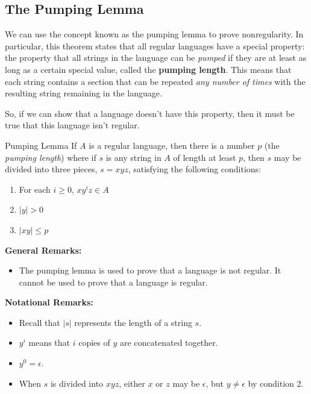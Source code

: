 \documentclass[letterpaper]{article}
\begin{document}
\subsection{The Pumping Lemma}
We can use the concept known as the pumping lemma to prove nonregularity. In particular, this theorem states that all regular languages have a special property: the property that all strings in the language can be \emph{pumped} if they are at least as long as a certain special value, called the \textbf{pumping length}. This means that each string contains a section that can be repeated \emph{any number of times} with the resulting string remaining in the language. 

\bigskip 

So, if we can show that a language doesn't have this property, then it must be true that this language isn't regular. 

\begin{theorem}{Pumping Lemma}{}
    If $A$ is a regular language, then there is a number $p$ (the \emph{pumping length}) where if $s$ is any string in $A$ of length at least $p$, then $s$ may be divided into three pieces, $s = xyz$, satisfying the following conditions: 
    \begin{enumerate}
        \item For each $i \geq 0$, $xy^i z \in A$
        \item $|y| > 0$
        \item $|xy| \leq p$
    \end{enumerate}
\end{theorem}
\textbf{General Remarks:}
\begin{itemize}
    \item The pumping lemma is used to prove that a language is not regular. It cannot be used to prove that a language is regular. 
\end{itemize}
\textbf{Notational Remarks:}
\begin{itemize}
    \item Recall that $|s|$ represents the length of a string $s$.
    \item $y^i$ means that $i$ copies of $y$ are concatenated together. 
    \item $y^0 = \epsilon$.
    \item When $s$ is divided into $xyz$, either $x$ or $z$ may be $\epsilon$, but $y \neq \epsilon$ by condition 2. 
\end{itemize}
\end{document}
